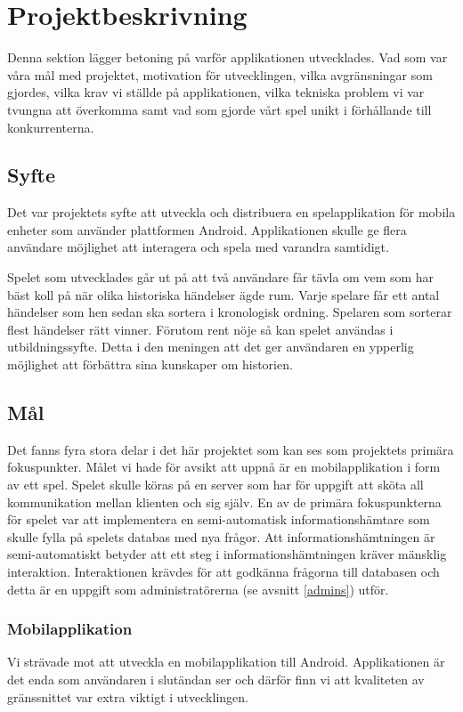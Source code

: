 \documentclass[a4paper, 11pt]{article}
\begin{document}
\section{Projektbeskrivning}
Denna sektion lägger betoning på varför applikationen utvecklades. Vad som var våra mål med projektet, motivation för utvecklingen, vilka avgränsningar som gjordes, vilka krav vi ställde på applikationen, vilka tekniska problem vi var tvungna att överkomma samt vad som gjorde vårt spel unikt i förhållande till konkurrenterna.

\subsection{Syfte}
Det var projektets syfte att utveckla och distribuera en spelapplikation för mobila enheter som använder plattformen Android. Applikationen skulle ge flera användare möjlighet att interagera och spela med varandra samtidigt.

Spelet som utvecklades går ut på att två användare får tävla om vem som har bäst koll på när olika historiska händelser ägde rum. Varje spelare får ett antal händelser som hen sedan ska sortera i kronologisk ordning. Spelaren som sorterar flest händelser rätt vinner. Förutom rent nöje så kan spelet användas i utbildningssyfte. Detta i den meningen att det ger användaren en ypperlig möjlighet att förbättra sina kunskaper om historien.

\subsection{Mål}
Det fanns fyra stora delar i det här projektet som kan ses som projektets primära fokuspunkter. Målet vi hade för avsikt att uppnå är en mobilapplikation i form av ett spel. Spelet skulle köras på en server som har för uppgift att sköta all kommunikation mellan klienten och sig själv. En av de primära fokuspunkterna för spelet var att implementera en semi-automatisk informationshämtare som skulle fylla på spelets databas med nya frågor. Att informationshämtningen är semi-automatiskt betyder att ett steg i informationshämtningen kräver mänsklig interaktion. Interaktionen krävdes för att godkänna frågorna till databasen och detta är en uppgift som administratörerna (se avsnitt \ref{admins}) utför. 


\subsubsection{Mobilapplikation}
Vi strävade mot att utveckla en mobilapplikation till Android. Applikationen är det enda som användaren i slutändan ser och därför finn vi att kvaliteten av gränssnittet var extra viktigt i utvecklingen. 
\end{document}
